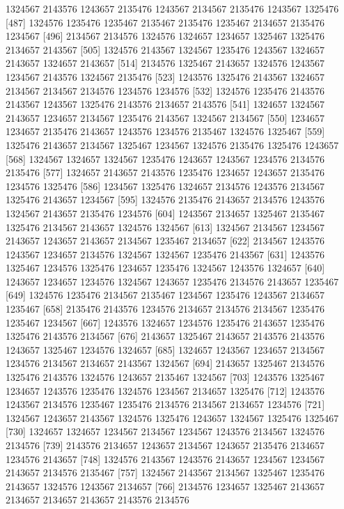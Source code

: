 \documentclass{scrartcl}
\begin{document}
\begin{Schunk}
\begin{Soutput}
 [478] 1324567 2143576 1243657 2135476 1243567 2134567 2135476 1243567 1325476
 [487] 1324576 1235476 1235467 2135467 2135476 1235467 2134657 2135476 1234567
 [496] 2134567 2134576 1324576 1324657 1234657 1325467 1325476 2134657 2143567
 [505] 1324576 2143567 1324567 1235476 1243567 1324657 2143657 1324657 2143657
 [514] 2134576 1325467 2143657 1324576 1243567 1234567 2143576 1324567 2135476
 [523] 1243576 1325476 2143567 1324657 2134567 2134567 2134576 1234576 1234576
 [532] 1324576 1235476 2143576 2143567 1243567 1325476 2143576 2134657 2143576
 [541] 1324657 1324567 2143657 1234657 2134567 1235476 2143567 1324567 2134567
 [550] 1234657 1234657 2135476 2143657 1243576 1234576 2135467 1324576 1325467
 [559] 1325476 2143657 2134567 1325467 1234567 1324576 2135476 1325476 1243657
 [568] 1324567 1324657 1324567 1235476 1243657 1243567 1234576 2134576 2135476
 [577] 1324657 2143657 2143576 1235476 1234657 1243657 2135476 1234576 1325476
 [586] 1234567 1325476 1324657 2134576 1243576 2134567 1325476 2143657 1234567
 [595] 1324576 2135476 2143657 2134576 1243576 1324567 2143657 2135476 1234576
 [604] 1243567 2134657 1325467 2135467 1325476 2134567 2143657 1324576 1324567
 [613] 1324567 2134567 1234567 2143657 1243657 2143657 2134567 1235467 2134657
 [622] 2134567 1243576 1243567 1234657 2134576 1324567 1324567 1235476 2143567
 [631] 1243576 1325467 1234576 1325476 1234657 1235476 1324567 1243576 1324657
 [640] 1243657 1234657 1234576 1324567 1243657 1235476 2134576 2143657 1235467
 [649] 1324576 1235476 2134567 2135467 1234567 1235476 1243567 2134657 1235467
 [658] 2135476 2143576 1234576 2134657 2134576 2134567 1235476 1235467 1234567
 [667] 1243576 1324657 1234576 1235476 2143657 1235476 1325476 2143576 2134567
 [676] 2143657 1325467 2143657 2143576 2143576 1243657 1325467 1234576 1324657
 [685] 1324657 1243567 1234657 2134567 1234576 2134567 2134657 2143567 1324567
 [694] 2143657 1325467 2134576 1325476 2143576 1324576 1243657 2135467 1324567
 [703] 1243576 1325467 1234657 1243576 1235476 1324576 1234567 2134657 1325476
 [712] 1243576 1243567 2134576 1235467 1235476 2134576 2134567 2134657 1234576
 [721] 1324567 1243657 2143567 1324576 1325476 1243657 1324567 1325476 1325467
 [730] 1324657 1324657 1234567 2134567 1234567 1243576 2134567 1324576 2134576
 [739] 2143576 2134657 1243657 2134567 1243657 2135476 2134657 1234576 2143657
 [748] 1324576 2143567 1243576 2143657 1234567 1234567 2143657 2134576 2135467
 [757] 1324567 2143567 2134567 1325467 1235476 2143657 1324576 1243567 2134657
 [766] 2134576 1234657 1325467 2143657 2134657 2134657 2143657 2143576 2134576

\end{Soutput}
\end{Schunk}
\end{document}
